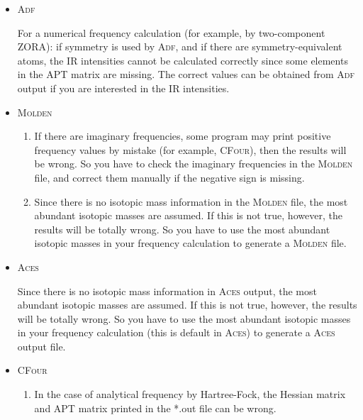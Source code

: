 \documentclass[12pt,english]{extarticle}
\begin{document}
\begin{itemize}
\item \textsc{Adf}

For a numerical frequency calculation (for example, by two-component ZORA): if symmetry is used by \textsc{Adf}, and if
there are symmetry-equivalent atoms, the IR intensities cannot be calculated correctly since some elements in the APT matrix are
missing. The correct values can be obtained from \textsc{Adf} output if you are interested in the IR intensities.

\item \textsc{Molden}

\begin{enumerate}
\item If there are imaginary frequencies, some program may print positive frequency values
by mistake (for example, \textsc{CFour}), then the results will be wrong. So you have to
check the imaginary frequencies in the \textsc{Molden} file, and correct them manually
if the negative sign is missing.

\item Since there is no isotopic mass information in the \textsc{Molden} file, the most
abundant isotopic masses are assumed. If this is not true, however, the results
will be totally wrong. So you have to use the most abundant isotopic masses
in your frequency calculation to generate a \textsc{Molden} file.
\end{enumerate}

\item \textsc{Aces}

Since there is no isotopic mass information in \textsc{Aces} output, the most
abundant isotopic masses are assumed. If this is not true, however, the results
will be totally wrong. So you have to use the most abundant isotopic masses
in your frequency calculation (this is default in \textsc{Aces}) to generate a \textsc{Aces} output file.

\item \textsc{CFour}

\begin{enumerate}
  \item In the case of analytical frequency by Hartree-Fock, the Hessian matrix and APT matrix printed in the *.out file can be wrong.


\end{enumerate}
\end{itemize}
\end{document}
